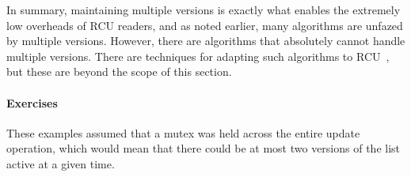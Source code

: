 In summary, maintaining multiple versions is exactly what enables the
extremely low overheads of RCU readers, and as noted earlier, many
algorithms are unfazed by multiple versions.
However, there are algorithms that absolutely cannot handle multiple versions.
There are techniques for adapting such algorithms to
RCU~\cite{PaulEdwardMcKenneyPhD},
but these are beyond the scope of this section.

\paragraph{Exercises}
\label{sec:defer:Exercises}

These examples assumed that a mutex was held across the entire
update operation, which would mean that there could be at most two
versions of the list active at a given time.

